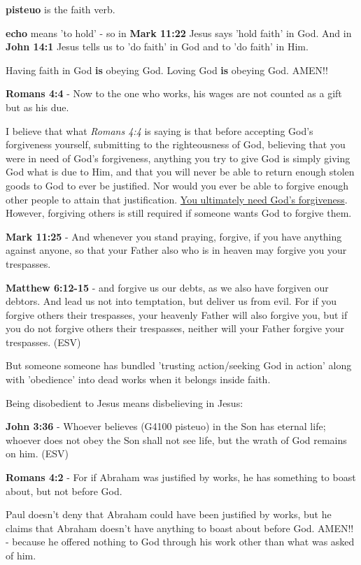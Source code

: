 \documentclass[11pt]{article}
\begin{document}
\textbf{pisteuo} is the faith verb.

\textbf{echo} means 'to hold' - so in \textbf{Mark 11:22} Jesus says 'hold faith' in God.
And in \textbf{John 14:1} Jesus tells us to 'do faith' in God and to 'do faith' in Him.

Having faith in God \textbf{is} obeying God. Loving God \textbf{is} obeying God. AMEN!!

\textbf{Romans 4:4} - Now to the one who works, his wages are not counted as a gift but as his due.

I believe that what \emph{Romans 4:4} is saying is that before accepting God's forgiveness yourself, submitting to the righteousness of God, believing that you were in need of God's forgiveness,
anything you try to give God is simply giving God what is due to Him, and that you will never be able to return enough stolen goods to God to ever be justified. Nor would you ever be able to forgive enough other people to attain that justification.
\uline{You ultimately need God's forgiveness}. However, forgiving others is still required if someone wants God to forgive them.

\textbf{Mark 11:25} - And whenever you stand praying, forgive, if you have anything against anyone, so that your Father also who is in heaven may forgive you your trespasses.

\textbf{Matthew 6:12-15} -  and forgive us our debts, as we also have forgiven our debtors.  And lead us not into temptation, but deliver us from evil.  For if you forgive others their trespasses, your heavenly Father will also forgive you, but if you do not forgive others their trespasses, neither will your Father forgive your trespasses.  (ESV)

But someone someone has bundled 'trusting
action/seeking God in action' along with
'obedience' into dead works when it belongs inside
faith.

Being disobedient to Jesus means disbelieving in Jesus:

\textbf{John 3:36} - Whoever believes (G4100 pisteuo) in the Son has eternal life; whoever does not obey the Son shall not see life, but the wrath of God remains on him. (ESV)

\textbf{Romans 4:2} - For if Abraham was justified by works, he has something to boast about, but not before God.

Paul doesn't deny that Abraham could have been
justified by works, but he claims that Abraham
doesn't have anything to boast about before
God. AMEN!! - because he offered nothing to God through his work other than what was asked of him.
\end{document}
